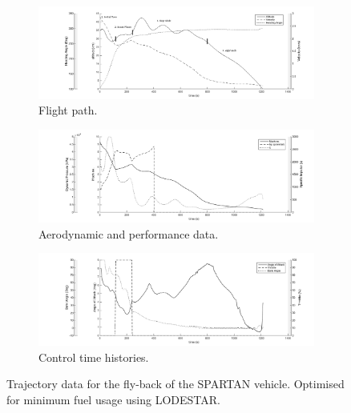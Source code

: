 \begin{figure}
	\begin{subfigure}[b]{\textwidth}
		\includegraphics[width=\linewidth]{Figures/6_flyback/Traj1}
		\vspace{-15pt}
		\caption{ Flight path.}
		\label{fig:Traj1}
	\end{subfigure}
	
	\begin{subfigure}[b]{\textwidth}
		\includegraphics[width=\linewidth]{Figures/6_flyback/Traj2}
		\vspace{-15pt}
		\caption{Aerodynamic and performance data. }
		\label{fig:Traj2}
	\end{subfigure}
	
	\begin{subfigure}[b]{\textwidth}
		\includegraphics[width=\linewidth]{Figures/6_flyback/Traj3}
		\vspace{-15pt}
		\caption{Control time histories.}
		\label{fig:Traj3}
	\end{subfigure}
	\caption{Trajectory data for the fly-back of the SPARTAN vehicle. Optimised for minimum fuel usage using LODESTAR.}
	\label{fig:AllTraj}
\end{figure}

